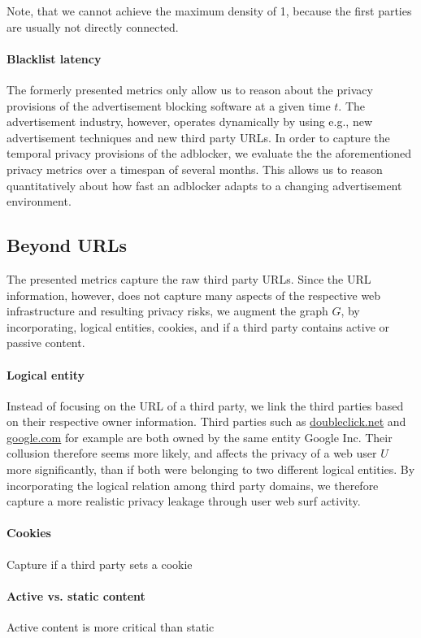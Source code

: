 \documentclass{sig-alternate}
\begin{document}
Note, that we cannot achieve the maximum density of 1, because the first parties are usually not directly connected.

\paragraph{Blacklist latency}
The formerly presented metrics only allow us to reason about the privacy provisions of the advertisement blocking software at a given time $t$. The advertisement industry, however, operates dynamically by using e.g., new advertisement techniques and new third party URLs. In order to capture the temporal privacy provisions of the adblocker, we evaluate the the aforementioned privacy metrics over a timespan of several months. This allows us to reason quantitatively about how fast an adblocker adapts to a changing advertisement environment.

\subsection{Beyond URLs}
The presented metrics capture the raw third party URLs. Since the URL information, however, does not capture many aspects of the respective web infrastructure and resulting privacy risks, we augment the graph $G$, by incorporating, logical entities, cookies, and if a third party contains active or passive content.

\paragraph{Logical entity}
Instead of focusing on the URL of a third party, we link the third parties based on their respective owner information. Third parties such as \url{doubleclick.net} and \url{google.com} for example are both owned by the same entity Google Inc. Their collusion therefore seems more likely, and affects the privacy of a web user $U$ more significantly, than if both were belonging to two different logical entities. By incorporating the logical relation among third party domains, we therefore capture a more realistic privacy leakage through user web surf activity.

\paragraph{Cookies}
Capture if a third party sets a cookie

\paragraph{Active vs. static content}
Active content is more critical than static
\end{document}

